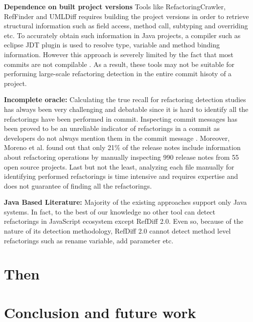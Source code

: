 \documentclass[letterpaper,12pt,onecolumn,final]{report}
\begin{document}
\textbf{Dependence on built project versions} Tools like RefactoringCrawler, RefFinder and UMLDiff requires building the project versions in order to retrieve structural information such as field access, method call, subtyping and overriding etc. To accurately obtain such information in Java projects, a compiler such as eclipse JDT plugin is used to resolve type, variable and method binding information. However this approach is severely limited by the fact that most commits are not compilable \cite{Tufano2017}. As a result, these tools may not be suitable for performing large-scale refactoring detection in the entire commit hisoty of a project.

\textbf{Incomplete oracle:} Calculating the true recall for refactoring detection studies has always been very challenging and debatable since it is hard to identify all the refactorings have been performed in commit. Inspecting commit messages has been proved to be an unreliable indicator of refactorings in a commit as developers do not always mention them in the commit message \cite{MurphyHill2012}. Moreover, Moreno et al. \cite{laura2017arena} found out that only 21\% of the release notes include information about refactoring operations by manually inspecting 990 release notes from 55 open source projects. Last but not the least, analyzing each file manually for identifying performed refactorings is time intensive and requires expertise and does not guarantee of finding all the refactorings. 

\textbf{Java Based Literature:} Majority of the existing approaches support only Java systems. In fact, to the best of our knowledge no other tool can detect refactorings in JavaScript ecosystem except RefDiff 2.0. Even so, because of the nature of its detection methodology, RefDiff 2.0 cannot detect method level refactorings such as rename variable, add parameter etc.


\chapter{Then}


\chapter{Conclusion and future work}
\label{chap:conclusion}
\end{document}
